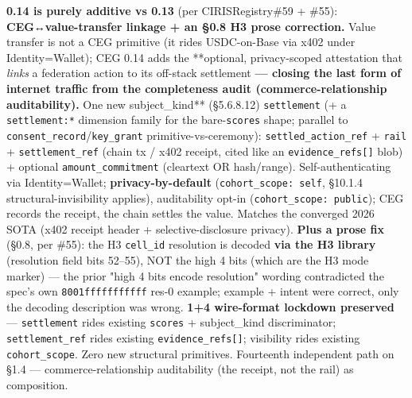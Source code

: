\documentclass[10pt]{article}
\begin{document}
\textbf{0.14 is purely additive vs 0.13} (per CIRISRegistry\#59 + \#55): \textbf{CEG↔value-transfer linkage + an §0.8 H3 prose correction.} Value transfer is not a CEG primitive (it rides USDC-on-Base via x402 under Identity=Wallet); CEG 0.14 adds the **optional, privacy-scoped attestation that \textit{links} a federation action to its off-stack settlement\textbf{ — closing the last form of internet traffic from the completeness audit (commerce-relationship auditability). }One new subject\_kind** (§5.6.8.12) \texttt{settlement} (+ a \texttt{settlement:*} dimension family for the bare-\texttt{scores} shape; parallel to \texttt{consent\_record}/\texttt{key\_grant} primitive-vs-ceremony): \texttt{settled\_action\_ref} + \texttt{rail} + \texttt{settlement\_ref} (chain tx / x402 receipt, cited like an \texttt{evidence\_refs[]} blob) + optional \texttt{amount\_commitment} (cleartext OR hash/range). Self-authenticating via Identity=Wallet; \textbf{privacy-by-default} (\texttt{cohort\_scope: self}, §10.1.4 structural-invisibility applies), auditability opt-in (\texttt{cohort\_scope: public}); CEG records the receipt, the chain settles the value. Matches the converged 2026 SOTA (x402 receipt header + selective-disclosure privacy). \textbf{Plus a prose fix} (§0.8, per \#55): the H3 \texttt{cell\_id} resolution is decoded \textbf{via the H3 library} (resolution field bits 52–55), NOT the high 4 bits (which are the H3 mode marker) — the prior "high 4 bits encode resolution" wording contradicted the spec's own \texttt{8001fffffffffff} res-0 example; example + intent were correct, only the decoding description was wrong. \textbf{1+4 wire-format lockdown preserved} — \texttt{settlement} rides existing \texttt{scores} + subject\_kind discriminator; \texttt{settlement\_ref} rides existing \texttt{evidence\_refs[]}; visibility rides existing \texttt{cohort\_scope}. Zero new structural primitives. Fourteenth independent path on §1.4 — commerce-relationship auditability (the receipt, not the rail) as composition.
\end{document}
